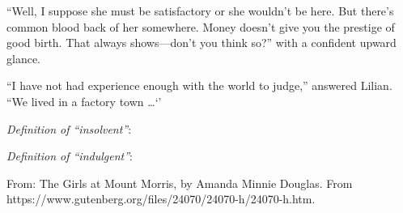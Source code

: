 \begin{enumerate}
``Well, I suppose she must be satisfactory or she wouldn’t be here. But there’s common blood back of her somewhere. Money doesn’t give you the prestige of good birth. That always shows—don’t you think so?'' with a confident upward glance.

``I have not had experience enough with the world to judge,'' answered Lilian. ``We lived in a factory town \ldots `'

\textit{Definition of ``insolvent''}: \hrulefill
\noindent\makebox[\linewidth]{\rule{\paperwidth}{0.4pt}}

\textit{Definition of ``indulgent''}: \hrulefill
\noindent\makebox[\linewidth]{\rule{\paperwidth}{0.4pt}}

From: The Girls at Mount Morris, by Amanda Minnie Douglas. From https://www.gutenberg.org/files/24070/24070-h/24070-h.htm. 


\end{enumerate}











